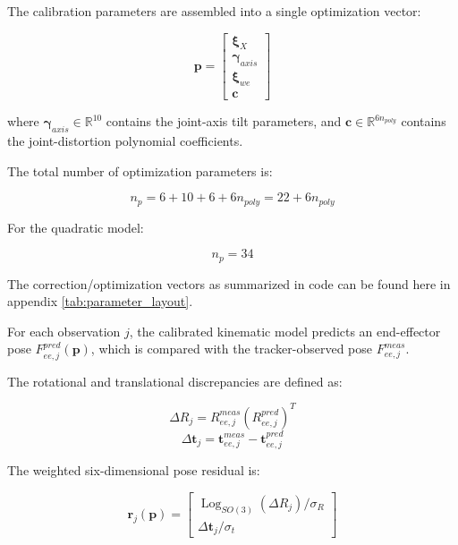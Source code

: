 \documentclass[11pt,letterpaper]{article}
\begin{document}
The calibration parameters are assembled into
a single optimization vector:

\begin{equation}
\boxed{
\mathbf{p}
=
\begin{bmatrix}
\boldsymbol{\xi}_X\\
\boldsymbol{\gamma}_{axis}\\
\boldsymbol{\xi}_{we}\\
\mathbf{c}
\end{bmatrix}
}
\end{equation}

where $\boldsymbol{\gamma}_{axis}\in\mathbb{R}^{10}$
contains the joint-axis tilt parameters, and
$\mathbf{c}\in\mathbb{R}^{6n_{poly}}$ contains
the joint-distortion polynomial coefficients.

The total number of optimization parameters is:

\begin{equation}
\boxed{
n_p=6+10+6+6n_{poly}
=22+6n_{poly}
}
\end{equation}

For the quadratic model:

\begin{equation}
\boxed{
n_p=34
}
\end{equation}

The correction/optimization vectors as summarized in code can be found here in appendix \cref{tab:parameter_layout}. 

For each observation $j$, the calibrated kinematic
model predicts an end-effector pose
$F_{ee,j}^{pred}(\mathbf{p})$, which is compared
with the tracker-observed pose $F_{ee,j}^{meas}$.

The rotational and translational discrepancies
are defined as:

\begin{equation}
\Delta R_j
=
R_{ee,j}^{meas}
(R_{ee,j}^{pred})^T
\end{equation}
\begin{equation}
\Delta\mathbf{t}_j
=
\mathbf{t}_{ee,j}^{meas}
-
\mathbf{t}_{ee,j}^{pred}
\end{equation}

The weighted six-dimensional pose residual is:

\begin{equation}
\boxed{
\mathbf{r}_j(\mathbf{p})
=
\begin{bmatrix}
\operatorname{Log}_{SO(3)}(\Delta R_j)/\sigma_R\\
\Delta\mathbf{t}_j/\sigma_t
\end{bmatrix}
}
\end{equation}
\end{document}
